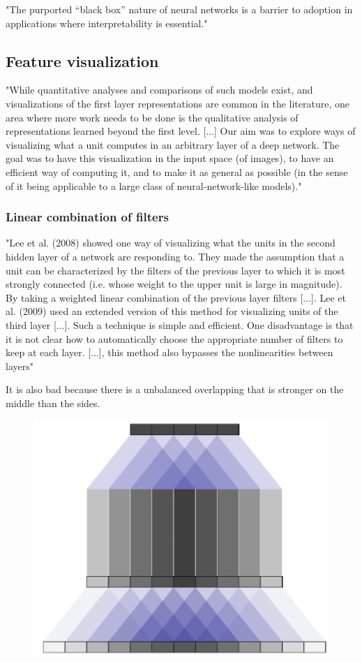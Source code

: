 "The purported “black box” nature of neural networks is a barrier to adoption in applications where interpretability is essential." \cite{Shrikumar2017}

	\subsection{Feature visualization}
	
	"While quantitative analyses and comparisons of such models exist, and visualizations of the first layer representations are common in the literature, one area where more work needs to be done is the qualitative analysis of representations learned beyond the first level. [...] Our aim was to explore ways of visualizing what a unit computes in an arbitrary layer of a deep network. The goal was to have this visualization in the input space (of images), to have an efficient way of computing it, and to make it as general as possible (in the sense of it being applicable to a large class of neural-network-like models)." \cite{Erhan2009}
	
		\subsubsection{Linear combination of filters}
		"Lee et al. (2008) showed one way of visualizing what the units in the second hidden layer of a network are responding to. They made the assumption that a unit can be characterized by the filters of the previous layer to which it is most strongly connected (i.e. whose weight to the upper unit is large in magnitude). By taking a weighted linear combination of the previous layer filters [...].
		Lee et al. (2009) used an extended version of this method for visualizing units of the third layer [...].
		Such a technique is simple and efficient. One disadvantage is that it is not clear how to automatically choose the appropriate number of filters to keep at each layer. [...], this method also bypasses the nonlinearities between layers" \cite{Erhan2009}
		
		It is also bad because there is a unbalanced overlapping that is stronger on the middle than the sides.
		\begin{figure}
		\centering
		\includegraphics[width=0.7\linewidth]{Figures/overlapping}
		\caption{}
		\label{fig:overlapping}
		\end{figure}
			

